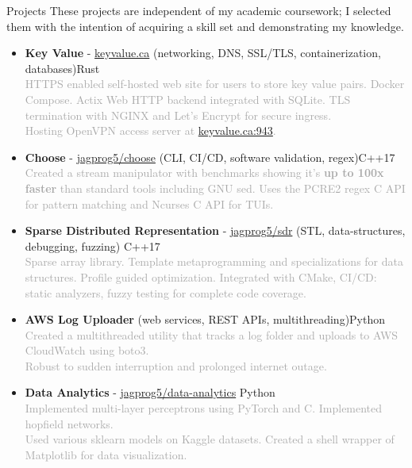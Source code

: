 \documentclass{resume} %
\begin{document}
\begin{rSection}{Projects}
    These projects are independent of my academic coursework; I selected them with the intention of acquiring a skill set and demonstrating my knowledge.
    \begin{itemize}
        \setlength\itemsep{-0.2em}
        \item {\bf Key Value} - \href{http://www.keyvalue.ca/}{keyvalue.ca} (networking, DNS, SSL/TLS, containerization, databases)\hfill Rust\\
        \textcolor{darkgray}{HTTPS enabled self-hosted web site for users to store key value pairs. Docker Compose. Actix Web HTTP backend integrated with SQLite. TLS termination with NGINX and Let's Encrypt for secure ingress.\\
        Hosting OpenVPN access server at \href{keyvalue.ca:943}{keyvalue.ca:943}.}
        \item {\bf Choose} - \href{https://github.com/jagprog5/choose/}{jagprog5/choose} (CLI, CI/CD, software validation, regex)\hfill C++17\\
        \textcolor{darkgray}{Created a stream manipulator with benchmarks showing it's \textbf{up to 100x faster} than standard tools including GNU sed.
        Uses the PCRE2 regex C API for pattern matching and Ncurses C API for TUIs.}
        \item {\bf Sparse Distributed Representation} - \href{https://github.com/jagprog5/SDR/}{jagprog5/sdr} (STL, data-structures, debugging, fuzzing) \hfill C++17\\
        \textcolor{darkgray}{Sparse array library. Template metaprogramming and specializations for data structures. Profile guided optimization. Integrated with CMake, CI/CD: static analyzers, fuzzy testing for complete code coverage.}
        \item {\bf AWS Log Uploader} (web services, REST APIs, multithreading)\hfill Python\\
        \textcolor{darkgray}{Created a multithreaded utility that tracks a log folder and uploads to AWS CloudWatch using boto3.\\
        Robust to sudden interruption and prolonged internet outage.}
        \item {\bf Data Analytics} - \href{https://github.com/jagprog5/resume/blob/main/data-analytics-projects.md}{jagprog5/data-analytics} \hfill Python\\
        \textcolor{darkgray}{Implemented multi-layer perceptrons using PyTorch and C. Implemented hopfield networks.\\
        Used various sklearn models on Kaggle datasets. Created a shell wrapper of Matplotlib for data visualization.}
    \end{itemize}
\end{rSection}
\end{document}
